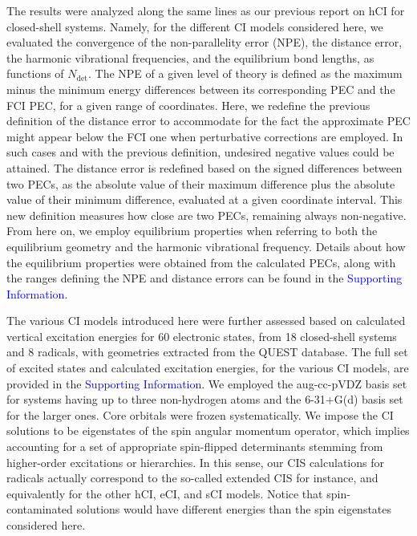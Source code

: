 \documentclass[aip,jcp,reprint,noshowkeys,superscriptaddress]{revtex4-1}
\newcommand{\SupInf}{\textcolor{blue}{Supporting Information}}
\newcommand{\Ndet}{N_\text{det}}
\begin{document}
The results were analyzed along the same lines as our previous report on hCI for closed-shell systems. \cite{Kossoski_2022}
Namely, for the different CI models considered here,
we evaluated the convergence of the non-parallelity error (NPE), the distance error, the harmonic vibrational frequencies, and the equilibrium bond lengths, as functions of $\Ndet$.
The NPE of a given level of theory is defined as the maximum minus the minimum energy differences between its corresponding PEC and the FCI PEC, for a given range of coordinates.
Here, we redefine the previous definition of the distance error \cite{Kossoski_2022} to accommodate for the fact the approximate PEC might appear below the FCI one when perturbative corrections are employed.
In such cases and with the previous definition, undesired negative values could be attained.
The distance error is redefined based on the signed differences between two PECs, as the absolute value of their maximum difference plus the absolute value of their minimum difference,
evaluated at a given coordinate interval.
This new definition measures how close are two PECs, remaining always non-negative.
From here on, we employ equilibrium properties when referring to both the equilibrium geometry and the harmonic vibrational frequency.
Details about how the equilibrium properties were obtained from the calculated PECs,
along with the ranges defining the NPE and distance errors can be found in the \SupInf.

The various CI models introduced here were further assessed based on calculated vertical excitation energies for 60 electronic states,
from 18 closed-shell systems and 8 radicals, with geometries extracted from the QUEST database. \cite{Veril_2021}
The full set of excited states and calculated excitation energies, for the various CI models, are provided in the {\SupInf}.
We employed the aug-cc-pVDZ basis set for systems having up to three non-hydrogen atoms and the 6-31+G(d) basis set for the larger ones.
Core orbitals were frozen systematically.
We impose the CI solutions to be eigenstates of the spin angular momentum operator, which implies accounting for a set of appropriate spin-flipped determinants stemming from higher-order excitations or hierarchies. \cite{Chilkuri_2021}
In this sense, our CIS calculations for radicals actually correspond to the so-called extended CIS \cite{Maurice_1996} for instance, and equivalently for the other hCI, eCI, and sCI models.
Notice that spin-contaminated solutions would have different energies than the spin eigenstates considered here.
\end{document}
